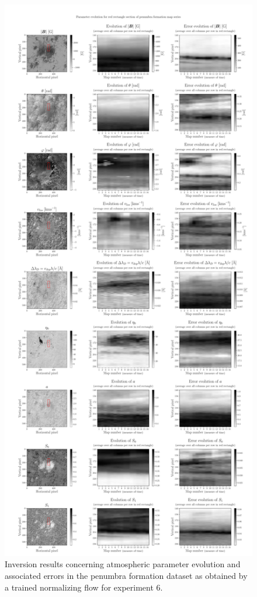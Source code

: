 \documentclass[a4paper,12pt]{report}
\begin{document}
\begin{figure}[h]
\centering
\includegraphics[height=\textheight-1cm]{figures/nf-milne-eddington-example-7-evolution2-nflows-piecewisequadratic.pdf}
\caption{Inversion results concerning atmospheric parameter evolution and associated errors in the penumbra formation dataset as obtained by a trained normalizing flow for experiment 6.}
\label{fig:nf-milne-eddington-example-7-evolution2-nflows-piecewisequadratic}
\end{figure}
\end{document}
